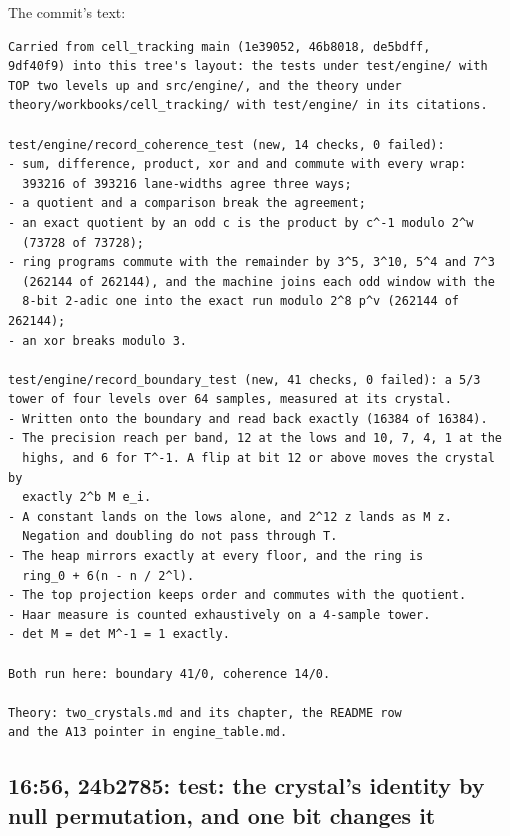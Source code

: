 The commit's text:

\begin{Verbatim}
Carried from cell_tracking main (1e39052, 46b8018, de5bdff,
9df40f9) into this tree's layout: the tests under test/engine/ with
TOP two levels up and src/engine/, and the theory under
theory/workbooks/cell_tracking/ with test/engine/ in its citations.

test/engine/record_coherence_test (new, 14 checks, 0 failed):
- sum, difference, product, xor and and commute with every wrap:
  393216 of 393216 lane-widths agree three ways;
- a quotient and a comparison break the agreement;
- an exact quotient by an odd c is the product by c^-1 modulo 2^w
  (73728 of 73728);
- ring programs commute with the remainder by 3^5, 3^10, 5^4 and 7^3
  (262144 of 262144), and the machine joins each odd window with the
  8-bit 2-adic one into the exact run modulo 2^8 p^v (262144 of 262144);
- an xor breaks modulo 3.

test/engine/record_boundary_test (new, 41 checks, 0 failed): a 5/3
tower of four levels over 64 samples, measured at its crystal.
- Written onto the boundary and read back exactly (16384 of 16384).
- The precision reach per band, 12 at the lows and 10, 7, 4, 1 at the
  highs, and 6 for T^-1. A flip at bit 12 or above moves the crystal by
  exactly 2^b M e_i.
- A constant lands on the lows alone, and 2^12 z lands as M z.
  Negation and doubling do not pass through T.
- The heap mirrors exactly at every floor, and the ring is
  ring_0 + 6(n - n / 2^l).
- The top projection keeps order and commutes with the quotient.
- Haar measure is counted exhaustively on a 4-sample tower.
- det M = det M^-1 = 1 exactly.

Both run here: boundary 41/0, coherence 14/0.

Theory: two_crystals.md and its chapter, the README row
and the A13 pointer in engine_table.md.
\end{Verbatim}

\subsection{\texorpdfstring{16:56, 24b2785: test: the crystal's identity by null permutation, and one bit changes it}{16:56, 24b2785: test: the crystal's identity by null permutation, and one bit changes it}}

